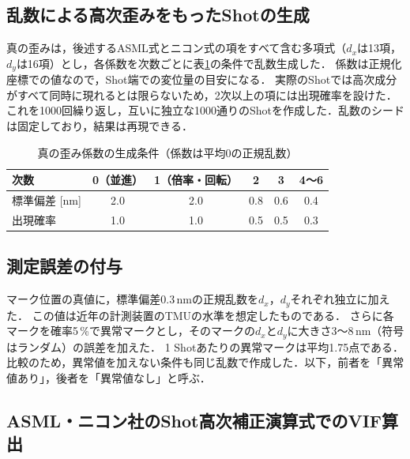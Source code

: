 \documentclass[11pt,a4paper]{ltjsarticle}
\begin{document}
\subsection{乱数による高次歪みをもったShotの生成}

真の歪みは，後述するASML式とニコン式の項をすべて含む多項式（$d_x$は13項，$d_y$は16項）とし，各係数を次数ごとに表\ref{tab:truth}の条件で乱数生成した．
係数は正規化座標での値なので，Shot端での変位量の目安になる．
実際のShotでは高次成分がすべて同時に現れるとは限らないため，2次以上の項には出現確率を設けた．
これを1000回繰り返し，互いに独立な1000通りのShotを作成した．乱数のシードは固定しており，結果は再現できる．

\begin{table}[tb]
  \centering
  \caption{真の歪み係数の生成条件（係数は平均0の正規乱数）}
  \label{tab:truth}
  \begin{tabular}{lccccc}
    \toprule
    次数 & 0（並進） & 1（倍率・回転） & 2 & 3 & 4〜6 \\
    \midrule
    標準偏差 [nm] & 2.0 & 2.0 & 0.8 & 0.6 & 0.4 \\
    出現確率      & 1.0 & 1.0 & 0.5 & 0.5 & 0.3 \\
    \bottomrule
  \end{tabular}
\end{table}

\subsection{測定誤差の付与}

マーク位置の真値に，標準偏差0.3\,nmの正規乱数を$d_x$，$d_y$それぞれ独立に加えた．
この値は近年の計測装置のTMUの水準\cite{Klein2026}を想定したものである．
さらに各マークを確率5\,\%で異常マークとし，そのマークの$d_x$と$d_y$に大きさ3〜8\,nm（符号はランダム）の誤差を加えた．
1 Shotあたりの異常マークは平均1.75点である．
比較のため，異常値を加えない条件も同じ乱数で作成した．以下，前者を「異常値あり」，後者を「異常値なし」と呼ぶ．

\subsection{ASML・ニコン社のShot高次補正演算式でのVIF算出}
\end{document}

